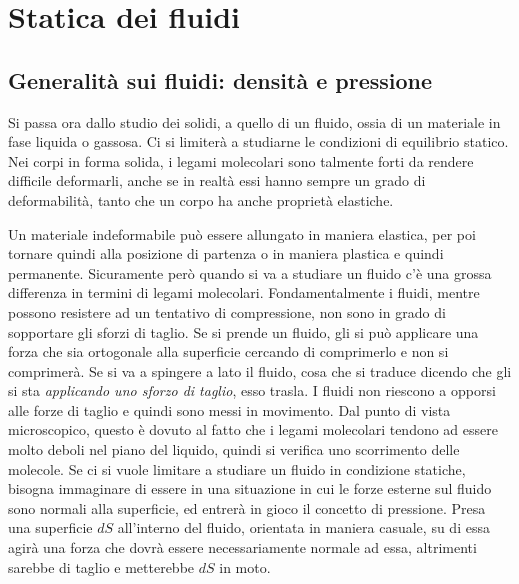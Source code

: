 \chapter{Statica dei fluidi}

\section{Generalità sui fluidi: densità e pressione}

Si passa ora dallo studio dei solidi, a quello di un fluido, ossia di un materiale in fase liquida o gassosa. Ci si limiterà a studiarne le condizioni di equilibrio statico. Nei corpi in forma solida, i legami molecolari sono talmente forti da rendere difficile deformarli, anche se in realtà essi hanno sempre un grado di deformabilità, tanto che un corpo ha anche proprietà elastiche.

Un materiale indeformabile può essere allungato in maniera elastica, per poi tornare quindi alla posizione di partenza o in maniera plastica e quindi permanente. Sicuramente però quando si va a studiare un fluido c'è una grossa differenza in termini di legami molecolari. Fondamentalmente i fluidi, mentre possono resistere ad un tentativo di compressione, non sono in grado di sopportare gli sforzi di taglio. Se si prende un fluido, gli si può applicare una forza che sia ortogonale alla superficie cercando di comprimerlo e non si comprimerà. Se si va a spingere a lato il fluido, cosa che si traduce dicendo che gli si sta \emph{applicando uno sforzo di taglio}, esso trasla. I fluidi non riescono a opporsi alle forze di taglio e quindi sono messi in movimento. Dal punto di vista microscopico, questo è dovuto al fatto che i legami molecolari tendono ad essere molto deboli nel piano del liquido, quindi si verifica uno scorrimento delle molecole.
Se ci si vuole limitare a studiare un fluido in condizione statiche, bisogna immaginare di essere in una situazione in cui le forze esterne sul fluido sono normali alla superficie, ed entrerà in gioco il concetto di pressione. Presa una superficie $dS$ all'interno del fluido, orientata in maniera casuale, su di essa agirà una forza che dovrà essere necessariamente normale ad essa, altrimenti sarebbe di taglio e metterebbe $dS$ in moto.

